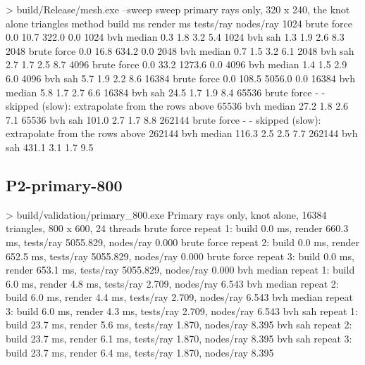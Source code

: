 \documentclass[11pt,a4paper]{article}
\begin{document}
\begin{terminal}
> build/Release/mesh.exe --sweep
  sweep          primary rays only, 320 x 240, the knot alone
  triangles  method         build ms   render ms   tests/ray  nodes/ray
       1024  brute force         0.0        10.7       322.0        0.0
       1024  bvh median          0.3         1.8         3.2        5.4
       1024  bvh sah             1.3         1.9         2.6        8.3
       2048  brute force         0.0        16.8       634.2        0.0
       2048  bvh median          0.7         1.5         3.2        6.1
       2048  bvh sah             2.7         1.7         2.5        8.7
       4096  brute force         0.0        33.2      1273.6        0.0
       4096  bvh median          1.4         1.5         2.9        6.0
       4096  bvh sah             5.7         1.9         2.2        8.6
      16384  brute force         0.0       108.5      5056.0        0.0
      16384  bvh median          5.8         1.7         2.7        6.6
      16384  bvh sah            24.5         1.7         1.9        8.4
      65536  brute force           -           -   skipped (slow): extrapolate from the
rows above
      65536  bvh median         27.2         1.8         2.6        7.1
      65536  bvh sah           101.0         2.7         1.7        8.8
     262144  brute force           -           -   skipped (slow): extrapolate from the
rows above
     262144  bvh median        116.3         2.5         2.5        7.7
     262144  bvh sah           431.1         3.1         1.7        9.5
\end{terminal}
\subsection*{P2-primary-800}
\begin{terminal}
> build/validation/primary_800.exe
Primary rays only, knot alone, 16384 triangles, 800 x 600, 24 threads
brute force repeat 1: build 0.0 ms, render 660.3 ms, tests/ray 5055.829, nodes/ray 0.000
brute force repeat 2: build 0.0 ms, render 652.5 ms, tests/ray 5055.829, nodes/ray 0.000
brute force repeat 3: build 0.0 ms, render 653.1 ms, tests/ray 5055.829, nodes/ray 0.000
bvh median repeat 1: build 6.0 ms, render 4.8 ms, tests/ray 2.709, nodes/ray 6.543
bvh median repeat 2: build 6.0 ms, render 4.4 ms, tests/ray 2.709, nodes/ray 6.543
bvh median repeat 3: build 6.0 ms, render 4.3 ms, tests/ray 2.709, nodes/ray 6.543
bvh sah repeat 1: build 23.7 ms, render 5.6 ms, tests/ray 1.870, nodes/ray 8.395
bvh sah repeat 2: build 23.7 ms, render 6.1 ms, tests/ray 1.870, nodes/ray 8.395
bvh sah repeat 3: build 23.7 ms, render 6.4 ms, tests/ray 1.870, nodes/ray 8.395
\end{terminal}
\end{document}
